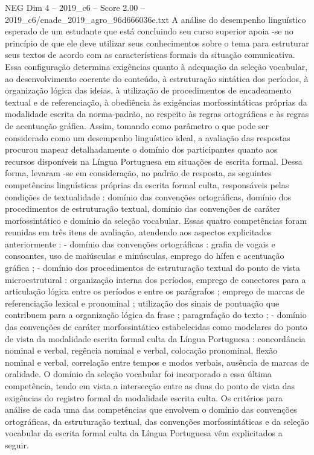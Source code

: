 \begin{textsample}{NEG Dim 4 – 2019\_c6 – Score 2.00 – 2019\_c6/enade\_2019\_agro\_96d666036e.txt}
A análise do desempenho linguístico esperado de um estudante que está concluindo seu curso superior apoia -se no princípio de que ele deve utilizar seus conhecimentos sobre o tema para estruturar seus textos de acordo com as características formais da situação comunicativa.
Essa configuração determina exigências quanto à adequação da seleção vocabular, ao desenvolvimento coerente do conteúdo, à estruturação sintática dos períodos, à organização lógica das ideias, à utilização de procedimentos de encadeamento textual e de referenciação, à obediência às exigências morfossintáticas próprias da modalidade escrita da norma-padrão, ao respeito às regras ortográficas e às regras de acentuação gráfica.
Assim, tomando como parâmetro o que pode ser considerado como um desempenho linguístico ideal, a avaliação das respostas procurou mapear detalhadamente o domínio dos participantes quanto aos recursos disponíveis na Língua Portuguesa em situações de escrita formal.
Dessa forma, levaram -se em consideração, no padrão de resposta, as seguintes competências linguísticas próprias da escrita formal culta, responsáveis pelas condições de textualidade : domínio das convenções ortográficas, domínio dos procedimentos de estruturação textual, domínio das convenções de caráter morfossintático e domínio da seleção vocabular.
Essas quatro competências foram reunidas em três itens de avaliação, atendendo aos aspectos explicitados anteriormente : - domínio das convenções ortográficas : grafia de vogais e consoantes, uso de maiúsculas e minúsculas, emprego do hífen e acentuação gráfica ; - domínio dos procedimentos de estruturação textual do ponto de vista microestrutural : organização interna dos períodos, emprego de conectores para a articulação lógica entre os períodos e entre os parágrafos ; emprego de marcas de referenciação lexical e pronominal ; utilização dos sinais de pontuação que contribuem para a organização lógica da frase ; paragrafação do texto ; - domínio das convenções de caráter morfossintático estabelecidas como modelares do ponto de vista da modalidade escrita formal culta da Língua Portuguesa : concordância nominal e verbal, regência nominal e verbal, colocação pronominal, flexão nominal e verbal, correlação entre tempos e modos verbais, ausência de marcas de oralidade.
O domínio da seleção vocabular foi incorporado a essa última competência, tendo em vista a intersecção entre as duas do ponto de vista das exigências do registro formal da modalidade escrita culta.
Os critérios para análise de cada uma das competências que envolvem o domínio das convenções ortográficas, da estruturação textual, das convenções morfossintáticas e da seleção vocabular da escrita formal culta da Língua Portuguesa vêm explicitados a seguir.

\end{textsample}
